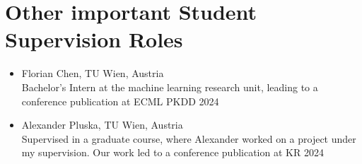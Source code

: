 \documentclass[10pt, a4paper]{article}
\begin{document}
 \section*{Other important Student Supervision Roles}
 
 \begin{itemize}
     \item Florian Chen, TU Wien, Austria\\
     Bachelor's Intern at the machine learning research unit, leading to a conference publication at ECML PKDD 2024
     \item Alexander Pluska,  TU Wien, Austria\\ Supervised in a graduate course, where Alexander worked on a project under my supervision. Our work led to a conference publication at KR 2024
 \end{itemize}
\end{document}
